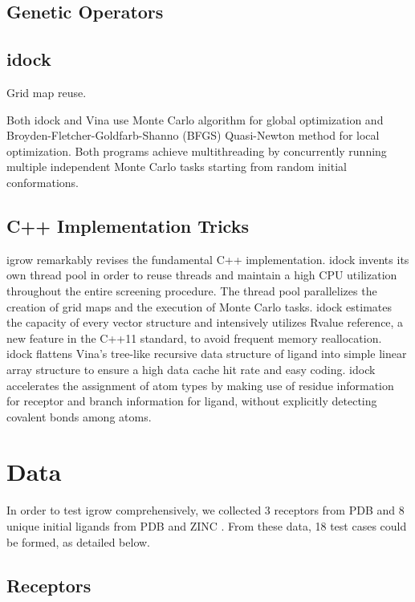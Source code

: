 \documentclass[10pt, conference, compsocconf]{../IEEEtran}
\begin{document}
\subsection{Genetic Operators}



\subsection{idock}

Grid map reuse.

Both idock and Vina use Monte Carlo algorithm for global optimization and Broyden-Fletcher-Goldfarb-Shanno (BFGS) \cite{786} Quasi-Newton method for local optimization. Both programs achieve multithreading by concurrently running multiple independent Monte Carlo tasks starting from random initial conformations.

\subsection{C++ Implementation Tricks}

igrow remarkably revises the fundamental C++ implementation. idock invents its own thread pool in order to reuse threads and maintain a high CPU utilization throughout the entire screening procedure. The thread pool parallelizes the creation of grid maps and the execution of Monte Carlo tasks. idock estimates the capacity of every vector structure and intensively utilizes Rvalue reference, a new feature in the C++11 standard, to avoid frequent memory reallocation. idock flattens Vina's tree-like recursive data structure of ligand into simple linear array structure to ensure a high data cache hit rate and easy coding. idock accelerates the assignment of atom types by making use of residue information for receptor and branch information for ligand, without explicitly detecting covalent bonds among atoms.

\section{Data}

In order to test igrow comprehensively, we collected 3 receptors from PDB \cite{96} and 8 unique initial ligands from PDB and ZINC \cite{55}. From these data, 18 test cases could be formed, as detailed below.

\subsection{Receptors}
\end{document}

